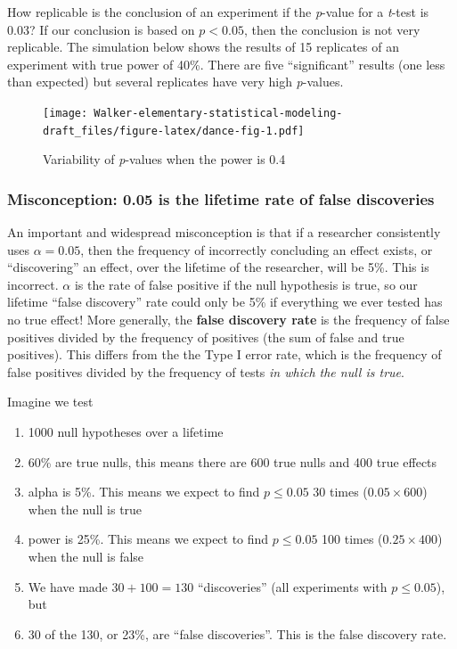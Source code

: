 \documentclass[]{book}
\providecommand{\tightlist}{%
  \setlength{\itemsep}{0pt}\setlength{\parskip}{0pt}}
\begin{document}
How replicable is the conclusion of an experiment if the \emph{p}-value
for a \emph{t}-test is 0.03? If our conclusion is based on \(p < 0.05\),
then the conclusion is not very replicable. The simulation below shows
the results of 15 replicates of an experiment with true power of 40\%.
There are five ``significant'' results (one less than expected) but
several replicates have very high \emph{p}-values.

\begin{figure}
\centering
\texttt{[image: Walker-elementary-statistical-modeling-draft\_files/figure-latex/dance-fig-1.pdf]}
\caption{\label{fig:dance-fig}Variability of \emph{p}-values when the power
is 0.4}
\end{figure}

\subsubsection{Misconception: 0.05 is the lifetime rate of false
discoveries}\label{misconception-0.05-is-the-lifetime-rate-of-false-discoveries}

An important and widespread misconception is that if a researcher
consistently uses \(\alpha=0.05\), then the frequency of incorrectly
concluding an effect exists, or ``discovering'' an effect, over the
lifetime of the researcher, will be 5\%. This is incorrect. \(\alpha\)
is the rate of false positive if the null hypothesis is true, so our
lifetime ``false discovery'' rate could only be 5\% if everything we
ever tested has no true effect! More generally, the \textbf{false
discovery rate} is the frequency of false positives divided by the
frequency of positives (the sum of false and true positives). This
differs from the the Type I error rate, which is the frequency of false
positives divided by the frequency of tests \emph{in which the null is
true}.

Imagine we test

\begin{enumerate}
\def\labelenumi{\arabic{enumi}.}
\tightlist
\item
  1000 null hypotheses over a lifetime
\item
  60\% are true nulls, this means there are 600 true nulls and 400 true
  effects
\item
  alpha is 5\%. This means we expect to find \(p \le 0.05\) 30 times
  (\(0.05 \times 600\)) when the null is true
\item
  power is 25\%. This means we expect to find \(p \le 0.05\) 100 times
  (\(0.25 \times 400\)) when the null is false
\item
  We have made \(30 + 100=130\) ``discoveries'' (all experiments with
  \(p \le 0.05\)), but
\item
  30 of the 130, or 23\%, are ``false discoveries''. This is the false
  discovery rate.
\end{enumerate}
\end{document}
